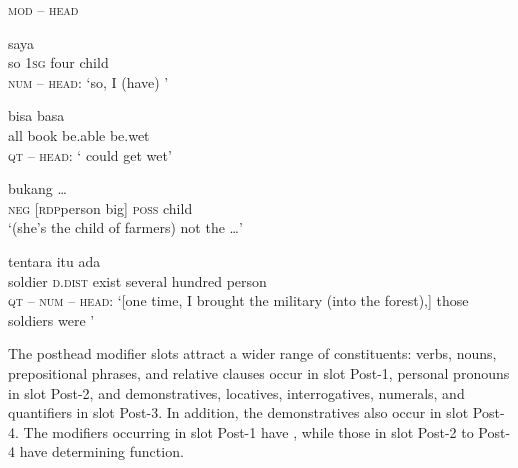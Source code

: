 \begin{styleExampleTitle}
\textsc{mod} – \textsc{head}
\end{styleExampleTitle}
\ea
\label{Example_8.6}
 {saya} {} {}\\ %
 so  \textsc{1sg}  four  child\\
\glt 
\textsc{num} – \textsc{head}: ‘so, I (have) ’ \textstyleExampleSource{[081006-024-CvEx.0002]}
\z

\ea
\label{Example_8.7}
 {} {bisa} {basa}\\ %
 all  book  be.able  be.wet\\
\glt 
\textsc{qt} – \textsc{head}: ‘ could get wet’ \textstyleExampleSource{[080917-008-NP.0189]}
\z

\ea
\label{Example_8.8}
\gll {\ldots} {bukang} {} {} {} {} {\ldots}\\ %
 { }  \textsc{neg}  \textsc{[rdp}{\Tilde}person  big]  \textsc{poss}  child  \\
\glt 
‘(she’s the child of farmers) not the  {\ldots}’ \textstyleExampleSource{[081110-005-Pr.0094]}
\z

\ea
\label{Example_8.9}
\gll {\ldots} {tentara} {itu} {ada} {} {} {}\\ %
 { }  soldier  \textsc{d.dist}  exist  several  hundred  person\\
\glt 
\textsc{qt} – \textsc{num} – \textsc{head}: ‘[one time, I brought the military (into the forest),] those soldiers were ’ \textstyleExampleSource{[081029-005-Cv.0131]}
\z


The posthead modifier slots attract a wider range of constituents: verbs, nouns, prepositional phrases, and relative clauses occur in slot Post-1, personal pronouns in slot Post-2, and demonstratives, locatives, interrogatives, numerals, and quantifiers in slot Post-3. In addition, the demonstratives also occur in slot Post-4. The modifiers occurring in slot Post-1 have , while those in slot Post-2 to Post-4 have determining function.



